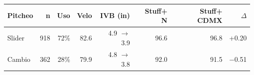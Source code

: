 \begin{tabular}{lrrrrrrr}
\toprule
Pitcheo & n & Uso & Velo & IVB (in) & Stuff+ N & Stuff+ CDMX & $\Delta$ \\
\midrule
Slider & 918 & 72\% & 82.6 & 4.9 $\to$ 3.9 & 96.6 & 96.8 & +0.20 \\
Cambio & 362 & 28\% & 79.9 & 4.8 $\to$ 3.8 & 92.0 & 91.5 & \ensuremath{-}0.51 \\
\bottomrule
\end{tabular}
